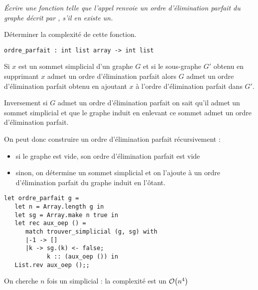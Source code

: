 \begin{Exercise}\it
Écrire une fonction  telle que l'appel  renvoie un ordre d'élimination parfait du graphe décrit par , s'il en existe un. 

Déterminer la complexité de cette fonction.
\end{Exercise}  
\begin{lstlisting}
ordre_parfait : int list array -> int list
\end{lstlisting}
\begin{Answer}
Si $x$ est un sommet simplicial d'un graphe $G$ et si le sous-graphe $G'$ obtenu en supprimant $x$ admet un ordre d'élimination parfait alors $G$ admet un ordre d'élimination parfait obtenu en ajoutant $x$ à l'ordre d'élimination parfait dans $G'$.

Inversement si $G$ admet un ordre d'élimination parfait on sait qu'il admet un sommet simplicial et que le graphe induit en enlevant ce sommet admet un ordre d'élimination parfait.

On peut donc construire un  ordre d'élimination parfait récursivement :
\begin{itemize}
\item si le graphe est vide, son ordre d'élimination parfait est vide
    \item sinon, on détermine un sommet simplicial et on l'ajoute à un ordre d'élimination parfait du graphe induit en l'ôtant.
    
\end{itemize}
\begin{lstlisting}
let ordre_parfait g =
   let n = Array.length g in
   let sg = Array.make n true in
   let rec aux_oep () =
      match trouver_simplicial (g, sg) with
      |-1 -> []
      |k -> sg.(k) <- false;
            k :: (aux_oep ()) in
   List.rev aux_oep ();;
\end{lstlisting} 
On cherche $n$ fois un simplicial : la complexité est un ${\cal O}\bigl(n^4\bigr)$
\end{Answer}
